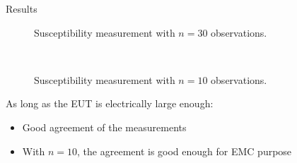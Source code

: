 \documentclass[final,hyperref={pdfpagelabels=false}]{beamer}
\begin{document}
\begin{frame}{}
\begin{columns}[t]
\begin{column}{0.32\linewidth}
\begin{block}{Results}
\begin{figure}
     \vspace{-0.3cm}
\large{\caption{Susceptibility measurement with $n=30$ observations.}}
     \label{fig_diagsCST}
\end{figure}
\vspace{-0.6cm}
\begin{figure}
     \centering
     \\
     \vspace{-0.3cm}
\large{\caption{Susceptibility measurement with $n=10$ observations.}}
     \label{fig_diagsCST}
\end{figure}
\vspace{0.8cm}
\large{As long as the EUT is electrically large enough:
\begin{itemize}
\item Good agreement of the measurements
\item With $n=10$, the agreement is good enough for EMC purpose
\end{itemize}}
      \end{block}
    \end{column}%
  \end{columns}


\end{frame}
\end{document}
